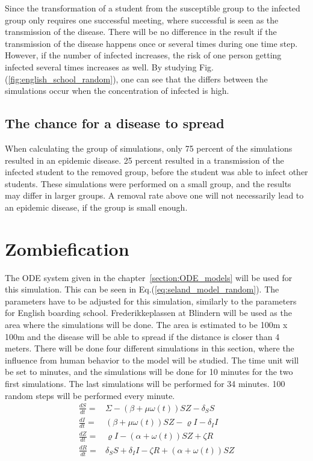 \documentclass[%
twoside,                 %
final,                   %
chapterprefix=true,      %
open=right               %
10pt]{book}
\begin{document}
\vspace{3mm}




\vspace{3mm}


Since the transformation of a student from the susceptible group to the infected group only requires one successful meeting, where successful is seen as the transmission of the disease. There will be no difference in the result if the transmission of the disease happens once or several times during one time step. However, if the number of infected increases, the risk of one person getting infected several times increases as well. By studying Fig.(\ref{fig:english_school_random}), one can see that the differs between the simulations occur when the concentration of infected is high. 

\subsection{The chance for a disease to spread}
When calculating the group of simulations, only 75 percent of the simulations resulted in an epidemic disease. 25 percent resulted in a transmission of the infected student to the removed group, before the student was able to infect other students. These simulations were performed on a small group, and the results may differ in larger groups. A removal rate above one will not necessarily lead to an epidemic disease, if the group is small enough.



\section{Zombiefication}
\label{section:3_zombiefication}
The ODE system given in the chapter~\ref{section:ODE_models} will be used for this simulation. This can be seen in Eq.(\ref{eq:seland_model_random}). The parameters have to be adjusted for this simulation, similarly to the parameters for English boarding school. Frederikkeplassen at Blindern will be used as the area where the simulations will be done. The area is estimated to be 100m x 100m and the disease will be able to spread if the distance is closer than 4 meters. There will be done four different simulations in this section, where the influence from human behavior to the model will be studied. The time unit will be set to minutes, and the simulations will be done for 10 minutes for the two first simulations. The last simulations will be performed for 34 minutes. 100 random steps will be performed every minute.       
\begin{equation} \label{eq:seland_model_random}
    \begin{aligned} 
    \frac{dS}{dt} =& \Sigma -(\beta+\mu \omega(t))SZ - \delta_SS \\
    \frac{dI}{dt} =& (\beta+\mu \omega(t))SZ - \varrho I - \delta_II\\
    \frac{dZ}{dt} =& \varrho I- (\alpha+\omega(t))SZ + \zeta R\\
    \frac{dR}{dt} =& \delta_SS +\delta_II -\zeta R + (\alpha+\omega(t))SZ 
    \end{aligned}
\end{equation}
\end{document}
